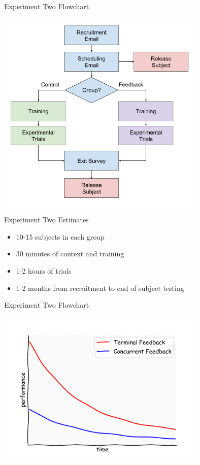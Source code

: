 \documentclass[10pt]{beamer}
\begin{document}
\begin{frame}[fragile]{Experiment Two Flowchart}
  \begin{center}
    \includegraphics[width=0.75\textwidth]{../img/robot_flow.png}
  \end{center}
\end{frame}

\begin{frame}[fragile]{Experiment Two Estimates}
  \begin{itemize}
    \setlength\itemsep{1em}
    \item 10-15 subjects in each group
    \item 30 minutes of context and training
    \item 1-2 hours of trials
    \item 1-2 months from recruitment to end of subject testing
  \end{itemize}
\end{frame}

\begin{frame}[fragile]{Experiment Two Flowchart}
  \begin{center}
    \includegraphics[width=0.75\textwidth]{../img/robot_estimate.pdf}
  \end{center}
\end{frame}
\end{document}
